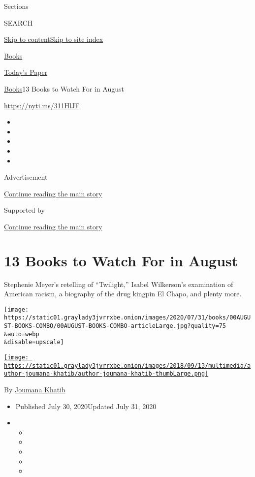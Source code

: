 Sections

SEARCH

\protect\hyperlink{site-content}{Skip to
content}\protect\hyperlink{site-index}{Skip to site index}

\href{https://www.nytimes3xbfgragh.onion/section/books}{Books}

\href{https://myaccount.nytimes3xbfgragh.onion/auth/login?response_type=cookie\&client_id=vi}{}

\href{https://www.nytimes3xbfgragh.onion/section/todayspaper}{Today's
Paper}

\href{/section/books}{Books}\textbar{}13 Books to Watch For in August

\url{https://nyti.ms/311HlJF}

\begin{itemize}
\item
\item
\item
\item
\item
\end{itemize}

Advertisement

\protect\hyperlink{after-top}{Continue reading the main story}

Supported by

\protect\hyperlink{after-sponsor}{Continue reading the main story}

\hypertarget{13-books-to-watch-for-in-august}{%
\section{13 Books to Watch For in
August}\label{13-books-to-watch-for-in-august}}

Stephenie Meyer's retelling of ``Twilight,'' Isabel Wilkerson's
examination of American racism, a biography of the drug kingpin El
Chapo, and plenty more.

\texttt{[image: https://static01.graylady3jvrrxbe.onion/images/2020/07/31/books/00AUGUST-BOOKS-COMBO/00AUGUST-BOOKS-COMBO-articleLarge.jpg?quality=75\\\&auto=webp\\\&disable=upscale]}

\href{https://nytimes3xbfgragh.onion/by/joumana-khatib}{\texttt{[image: https://static01.graylady3jvrrxbe.onion/images/2018/09/13/multimedia/author-joumana-khatib/author-joumana-khatib-thumbLarge.png]}}

By \href{https://nytimes3xbfgragh.onion/by/joumana-khatib}{Joumana
Khatib}

\begin{itemize}
\item
  Published July 30, 2020Updated July 31, 2020
\item
  \begin{itemize}
  \item
  \item
  \item
  \item
  \item
  \end{itemize}
\end{itemize}

